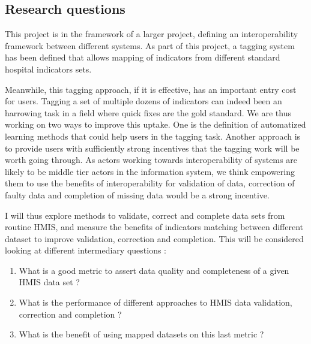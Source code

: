 \subsection{Research questions}

This project is in the framework of a larger project, defining an interoperability framework between different systems. As part of this project, a tagging system has been defined that allows mapping of indicators from different standard hospital indicators sets. %


Meanwhile, this tagging approach, if it is effective, has an important entry cost for users. Tagging a set of multiple dozens of indicators can indeed been an harrowing task in a field where quick fixes are the gold standard. %
We are thus working on two ways to improve this uptake. One is the definition of automatized learning methods that could help users in the tagging task. Another approach is to provide users with sufficiently strong incentives that the tagging work will be worth going through. As actors working towards interoperability of systems are likely to be middle tier actors in the information system, we think empowering them to use the benefits of interoperability for validation of data, correction of faulty data and completion of missing data would be a strong incentive.

I will thus explore methods to validate, correct and complete data sets from routine HMIS, and measure the benefits of indicators matching between different dataset to improve validation, correction and completion. This will be considered looking at different intermediary questions :

\begin{enumerate}
    \item What is a good metric to assert data quality and completeness of a given HMIS data set ?
    \item What is the performance of different approaches to HMIS data validation, correction and completion ?
    \item What is the benefit of using mapped datasets on this last metric ?
\end{enumerate}

